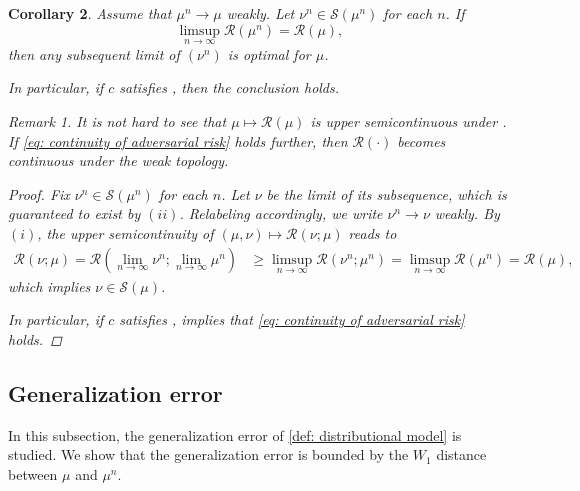 \documentclass{amsart}
\theoremstyle{plain}
\numberwithin{equation}{section}\newtheorem{theorem}{Theorem}[section]
\newtheorem{corollary}[theorem]{Corollary}
\theoremstyle{remark}
\newtheorem{remark}[theorem]{Remark}
\begin{document}
\begin{corollary}\label{cor: continuity of attack}
Assume that $\mu^n \to \mu$ weakly. Let $\nu^n \in \mathcal{S}(\mu^n)$ for each $n$. If 
\begin{equation}\label{eq: continuity of adversarial risk}
    \limsup_{n \to\infty} \mathscr{R}(\mu^n) = \mathscr{R}(\mu),
\end{equation}
then any subsequent limit of $(\nu^n)$ is optimal for $\mu$.


In particular, if $c$ satisfies , then the conclusion holds.

\begin{remark}\label{rmk: upper semicontinuity}
It is not hard to see that $\mu \mapsto \mathscr{R}(\mu)$ is upper semicontinuous under . If \eqref{eq: continuity of adversarial risk} holds further, then $\mathscr{R}(\cdot)$ becomes continuous under the weak topology.
\end{remark}


\begin{proof}
Fix $\nu^n \in \mathcal{S}(\mu^n)$ for each $n$. Let $\nu$ be the limit of its subsequence, which is guaranteed to exist by  $(ii)$. Relabeling accordingly, we write $\nu^n \to \nu$ weakly. By  $(i)$, the upper semicontinuity of $(\mu,\nu) \mapsto \mathscr{R}(\nu;\mu)$ reads to
\begin{align*}
    \mathscr{R}(\nu;\mu)= \mathscr{R}(\lim_{n \to \infty} \nu^n; \lim_{n \to \infty} \mu^n) &\geq \limsup_{n \to \infty} \mathscr{R}(\nu^n ;  \mu^n)= \limsup_{n \to \infty} \mathscr{R}(\mu^n) = \mathscr{R}(\mu),
\end{align*}
which implies $\nu \in \mathcal{S}(\mu)$.



In particular, if $c$ satisfies ,  implies that \eqref{eq: continuity of adversarial risk} holds. 
\end{proof}    
\end{corollary}





\subsection{Generalization error}
In this subsection, the generalization error of \eqref{def: distributional model} is studied. We show that the generalization error is bounded by the $W_1$ distance between $\mu$ and $\mu^n$. 
\end{document}
